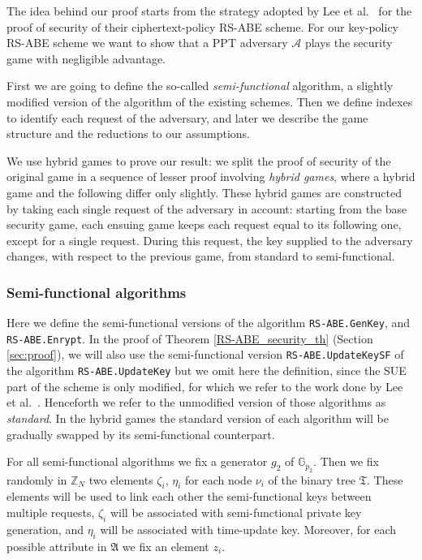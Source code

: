 \documentclass[a4paper,10pt]{article}
\newcommand{\G}{\mathbb{G}}
\newcommand{\Z}{\mathbb{Z}}
\newcommand{\tree}{\mathfrak{T}}
\newcommand{\algorithm}[2]{\texttt{#1.#2}}
\begin{document}
The idea behind our proof starts from the strategy adopted by Lee et al.~\cite{lee2013RSABE} for the proof of security of their ciphertext-policy RS-ABE scheme. For our key-policy RS-ABE scheme we want to show that a PPT adversary $\mathcal{A}$ plays the security game with negligible advantage.
	
	First we are going to define the so-called \emph{semi-functional} algorithm, a slightly modified version of the algorithm of the existing schemes. Then we define indexes to identify each request of the adversary, and later we describe the game structure and the reductions to our assumptions.
	
	We use hybrid games to prove our result: we split the proof of security of the original game in a sequence of lesser proof involving \emph{hybrid games}, where a hybrid game and the following differ 	only slightly. These hybrid games are constructed by taking each single request of the adversary in account: starting from the base security game, each ensuing game keeps each request equal to its following one, except for a single request. During this request, the key supplied to the adversary changes, with respect to the previous game, from standard to semi-functional.
	


	\subsubsection{Semi-functional algorithms}
	\label{semifunctional.def}
	Here we define the semi-functional versions of the algorithm \algorithm{RS-ABE}{GenKey}, and \algorithm{RS-ABE}{Enrypt}. 
	In the proof of Theorem \ref{RS-ABE_security_th} (Section \ref{sec:proof}), we will also use the semi-functional version \algorithm{RS-ABE}{UpdateKeySF} of the algorithm \algorithm{RS-ABE}{UpdateKey} but we omit here the definition, since the SUE part of the scheme is only modified, for which we refer to the work done by Lee et al.~\cite{lee2013RSABE}.  
	Henceforth we refer to the unmodified version of those algorithms as \emph{standard}. In the hybrid games the standard version of each algorithm will be gradually swapped by its semi-functional counterpart.

	For all semi-functional algorithms we fix a generator $g_2$ of $\G_{p_2}$. Then we fix randomly in $\Z_N$ two elements $\zeta_i$, $\eta_i$ for each node $\nu_i$ of the binary tree $\tree$. These elements will be used to link each other the semi-functional keys between multiple requests, $\zeta_i$ will be associated with semi-functional private key generation, and $\eta_i$ will be associated with time-update key.	
Moreover, for each possible attribute in $\mathfrak{A}$ we fix an element $z_i$.
\end{document}
